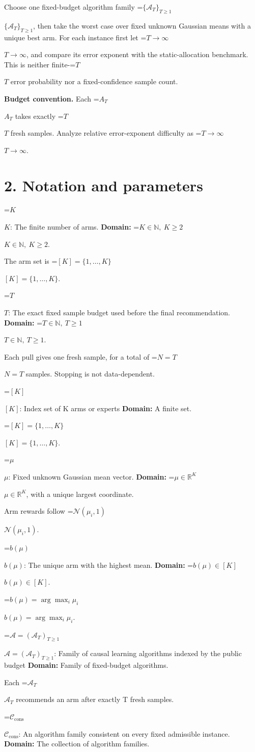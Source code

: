 \documentclass[10pt,a4paper]{article}
\newcommand{\AtlasMath}[1]{\par\begingroup\centering\setbox0=\hbox{$\displaystyle #1$}\ifdim\wd0>1.4\linewidth\typeout{ATLAS WIDE FORMULA: \the\wd0}\fi\ifdim\wd0>\linewidth\resizebox{\linewidth}{!}{\box0}\else\box0\fi\par\endgroup}
\newcommand{\AtlasInlineMath}[1]{\begingroup\setbox0=\hbox{$#1$}\ifdim\wd0>.4\linewidth\endgroup\AtlasMath{#1}\else\endgroup$#1$\fi}
\begin{document}
Choose one fixed-budget algorithm family \AtlasInlineMath{\{\mathcal{A}_T\}_{T\ge1}}, then take the worst case over fixed unknown Gaussian means with a unique best arm. For each instance first let \AtlasInlineMath{T\to\infty}, and compare its error exponent with the static-allocation benchmark. This is neither finite-\AtlasInlineMath{T} error probability nor a fixed-confidence sample count.

\textbf{Budget convention.} Each \AtlasInlineMath{A_T} takes exactly \AtlasInlineMath{T} fresh samples. Analyze relative error-exponent difficulty as \AtlasInlineMath{T\to\infty}.

\section{2. Notation and parameters}
\AtlasInlineMath{K}: The finite number of arms. \textbf{Domain:} \AtlasInlineMath{K\in\mathbb N,\ K\ge2}.

The arm set is \AtlasInlineMath{[K]=\{1,\ldots,K\}}.

\AtlasInlineMath{T}: The exact fixed sample budget used before the final recommendation. \textbf{Domain:} \AtlasInlineMath{T\in\mathbb N,\ T\ge1}.

Each pull gives one fresh sample, for a total of \AtlasInlineMath{N=T} samples. Stopping is not data-dependent.

\AtlasInlineMath{[K]}: Index set of K arms or experts \textbf{Domain:} A finite set.

\AtlasInlineMath{[K]=\{1,\ldots,K\}}.

\AtlasInlineMath{\mu}: Fixed unknown Gaussian mean vector. \textbf{Domain:} \AtlasInlineMath{\mu\in\mathbb R^K}, with a unique largest coordinate.

Arm rewards follow \AtlasInlineMath{\mathcal N(\mu_i,1)}.

\AtlasInlineMath{b(\mu)}: The unique arm with the highest mean. \textbf{Domain:} \AtlasInlineMath{b(\mu)\in[K]}.

\AtlasInlineMath{b(\mu)=\arg\max_i\mu_i}.

\AtlasInlineMath{\mathcal A=(\mathcal A_T)_{T\ge1}}: Family of causal learning algorithms indexed by the public budget \textbf{Domain:} Family of fixed-budget algorithms.

Each \AtlasInlineMath{\mathcal A_T} recommends an arm after exactly T fresh samples.

\AtlasInlineMath{\mathcal C_{\mathrm{cons}}}: An algorithm family consistent on every fixed admissible instance. \textbf{Domain:} The collection of algorithm families.
\end{document}

